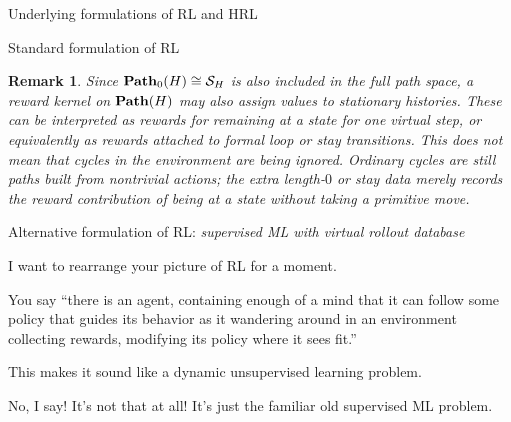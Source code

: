 \documentclass[11pt]{article}
\newtheorem{remark}[subsubsection]{Remark}
\begin{document}
\begin{section}{Underlying formulations of RL and HRL}
\begin{subsection}{Standard formulation of RL}
\begin{remark}
Since $\bold{Path}_{0}(H)\cong\mathcal{S}_{H}$ is also included in the full path space, a reward kernel on $\bold{Path}(H)$ may also assign values to stationary histories. These can be interpreted as rewards for remaining at a state for one virtual step, or equivalently as rewards attached to formal loop or stay transitions. This does not mean that cycles in the environment are being ignored. Ordinary cycles are still paths built from nontrivial actions; the extra length-$0$ or stay data merely records the reward contribution of being at a state without taking a primitive move.
\end{remark}
 
\end{subsection}

\begin{subsection}{Alternative formulation of RL: {\em supervised ML with virtual rollout database}}

I want to rearrange your picture of RL for a moment.

You say ``there is an agent, containing enough of a mind that it can follow some policy that guides its behavior as it wandering around in an environment collecting rewards, modifying its policy where it sees fit.'' 

This makes it sound like a dynamic unsupervised learning problem. 

No, I say! It's not that at all! It's just the familiar old supervised ML problem.


\end{subsection}
\end{section}
\end{document}
